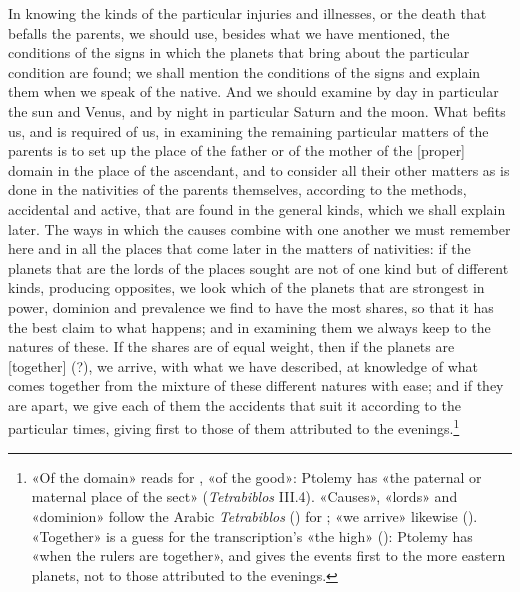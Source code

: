\documentclass[11pt]{article}
\newcommand{\Fol}[1]{\marginpar{\footnotesize\color{gray}f.\,#1}}
\begin{document}
\par \Fol{38v}In knowing the kinds of the particular injuries and illnesses, or the death that befalls the parents, we should use, besides what we have mentioned, the conditions of the signs in which the planets that bring about the particular condition are found; we shall mention the conditions of the signs and explain them when we speak of the native. And we should examine by day in particular the sun and Venus, and by night in particular Saturn and the moon. What befits us, and is required of us, in examining the remaining particular matters of the parents is to set up the place of the father or of the mother of the [proper] domain in the place of the ascendant, and to consider all their other matters as is done in the nativities of the parents themselves, according to the methods, accidental and active, that are found in the general kinds, which we shall explain later. The ways in which the causes combine with one another we must remember here and in all the places that come later in the matters of nativities: if the planets that are the lords of the places sought are not of one kind but of different kinds, producing opposites, we look which of the planets that are strongest in power, dominion and prevalence we find to have the most shares, so that it has the best claim to what happens; and in examining them we always keep to the natures of these. If the shares are of equal weight, then if the planets are [together] (?), we arrive, with what we have described, at knowledge of what comes together from the mixture of these different natures with ease; and if they are apart, we give each of them the accidents that suit it according to the particular times, giving first to those of them attributed to the evenings.\footnote{«Of the domain» reads  for , «of the good»: Ptolemy has «the paternal or maternal place of the sect» (\emph{Tetrabiblos} III.4). «Causes», «lords» and «dominion» follow the Arabic \emph{Tetrabiblos} () for ; «we arrive» likewise (). «Together» is a guess for the transcription's «the high» (): Ptolemy has «when the rulers are together», and gives the events first to the more eastern planets, not to those attributed to the evenings.}\par
\end{document}
